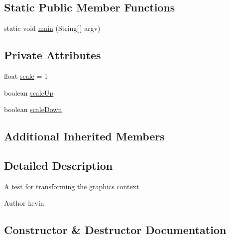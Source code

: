 \subsection*{Static Public Member Functions}
\begin{DoxyCompactItemize}
\item 
static void \mbox{\hyperlink{classorg_1_1newdawn_1_1slick_1_1tests_1_1_transform_test_a3c04f73037a551e84f971fa0511d13ff}{main}} (String\mbox{[}$\,$\mbox{]} argv)
\end{DoxyCompactItemize}
\subsection*{Private Attributes}
\begin{DoxyCompactItemize}
\item 
float \mbox{\hyperlink{classorg_1_1newdawn_1_1slick_1_1tests_1_1_transform_test_a3f9bd311b4aed7f2b69dac1f422e1547}{scale}} = 1
\item 
boolean \mbox{\hyperlink{classorg_1_1newdawn_1_1slick_1_1tests_1_1_transform_test_aae392ece0303e93157331a226863f789}{scale\+Up}}
\item 
boolean \mbox{\hyperlink{classorg_1_1newdawn_1_1slick_1_1tests_1_1_transform_test_a3f3abdb195eb3e8d3f94035370279110}{scale\+Down}}
\end{DoxyCompactItemize}
\subsection*{Additional Inherited Members}


\subsection{Detailed Description}
A test for transforming the graphics context

\begin{DoxyAuthor}{Author}
kevin 
\end{DoxyAuthor}


\subsection{Constructor \& Destructor Documentation}
\mbox{\label{classorg_1_1newdawn_1_1slick_1_1tests_1_1_transform_test_a9842c748eea04a509dd47a049c877d35}} 
